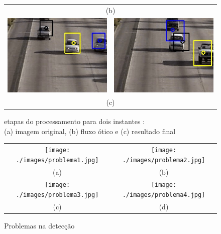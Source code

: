 \documentclass[journal]{IEEEtran}
\begin{document}
\begin{figure}[h]
\begin{tabular}{cc}
		      \multicolumn{2}{c}{\scriptsize(b) }  \\
	\includegraphics[scale = 0.3]{./images/output1.jpg}& 
	\includegraphics[scale = 0.3]{./images/output2.jpg}\\
		      \multicolumn{2}{c}{\scriptsize(c) }
  \end{tabular}  
  \caption{etapas do processamento para dois instantes : \\
  (a) imagem original,
  (b) fluxo ótico e
  (c) resultado final}
  \label{fig:resultados}
\end{figure}
\FloatBarrier

\FloatBarrier
\begin{figure}[h]
  \centering  
    \begin{tabular}{cc}
  \texttt{[image: ./images/problema1.jpg]}& 
  \texttt{[image: ./images/problema2.jpg]} \\
        {\scriptsize (a)} & {\scriptsize(b)}  \\
  \texttt{[image: ./images/problema3.jpg]} &
  \texttt{[image: ./images/problema4.jpg]}\\
         {\scriptsize(c)} & {\scriptsize(d)}  \\
  \end{tabular}  
  \caption{Problemas na detecção}
  \label{fig:problemas}
\end{figure}
\FloatBarrier
\end{document}
